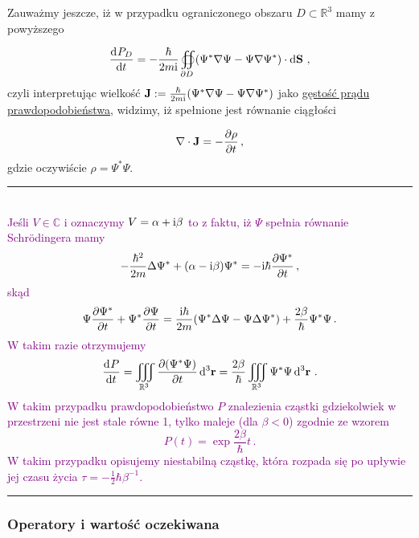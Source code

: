 \documentclass{myclass}
\begin{document}
Zauważmy jeszcze, iż w przypadku ograniczonego obszaru \(D\subset \mathbb{R}^3\) mamy z powyższego

\begin{equation*}
\dv[]{P_D}{t}=-\frac{\hbar}{2m\mathrm{i}}\oiint_{\partial D}(\Psi^*\nabla\Psi-\Psi\nabla\Psi^*)\cdot\dd{\mathbf{S}}\,,
\end{equation*}
czyli interpretując wielkość \(\mathbf{J}:=\frac{\hbar}{2m\mathrm{i}}(\Psi^*\nabla\Psi-\Psi\nabla\Psi^*)\)
jako \underline{gęstość prądu prawdopodobieństwa}, widzimy, iż spełnione jest równanie ciągłości

\begin{equation*}
\nabla\cdot\mathbf{J}=-\pdv{\rho}{t}\,,
\end{equation*}
gdzie oczywiście \(\rho=\Psi^*\Psi\).
\medskip

\noindent\rule{\columnwidth}{0.5pt}\\
\textcolor{purple}{Jeśli \(V\in\mathbb{C}\) i oznaczymy \(V=\alpha+\mathrm{i}\beta\) to z faktu, iż
\(\Psi\) spełnia równanie Schr{\"o}dingera mamy
\begin{equation*}
-\frac{\hbar^2}{2m}\Delta\Psi^*+(\alpha-\mathrm{i}\beta)\Psi^*=-\mathrm{i}\hbar\pdv{\Psi^*}{t}\,,
\end{equation*}
skąd
\begin{equation*}
    \Psi\pdv{\Psi^*}{t}+\Psi^*\pdv{\Psi}{t}=\frac{\mathrm{i}\hbar}{2m}(\Psi^*\Delta\Psi-\Psi\Delta\Psi^*)+\frac{2\beta}{\hbar}\Psi^*\Psi\,.
\end{equation*}
W takim razie otrzymujemy
\begin{equation*}
    \dv[]{P}{t}=\iiint_{\mathbb{R}^3}\pdv{(\Psi^*\Psi)}{t}\dd{^3\mathbf{r}}=\frac{2\beta}{\hbar}\iiint_{\mathbb{R}^3}\Psi^*\Psi\dd{^3\mathbf{r}}\,.
\end{equation*}
W takim przypadku prawdopodobieństwo \(P\) znalezienia cząstki gdziekolwiek w przestrzeni nie jest
stale równe 1, tylko maleje (dla \(\beta<0\)) zgodnie ze wzorem
\begin{equation*}
    P(t)=\exp{\frac{2\beta}{\hbar}t}\,.
\end{equation*}
W takim przypadku opisujemy niestabilną cząstkę, która rozpada się po upływie jej czasu życia
\(\tau=-\frac{1}{2}\hbar\beta^{-1}\).}\\
\noindent\rule{\columnwidth}{0.5pt}

\subsubsection{Operatory i wartość oczekiwana}
\end{document}
